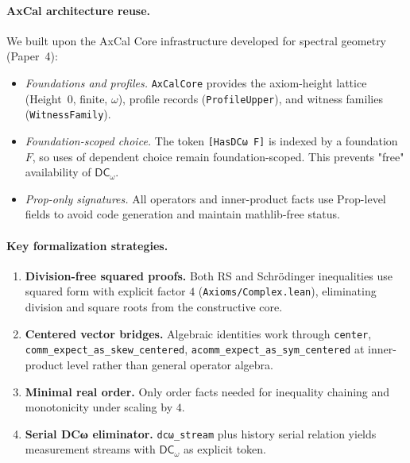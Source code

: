 \documentclass[11pt]{article}
\newcommand{\DCw}{\mathsf{DC}_{\omega}}
\newcommand{\lean}[1]{\texttt{#1}}
\theoremstyle{plain}
\theoremstyle{definition}
\theoremstyle{remark}
\begin{document}
\paragraph{AxCal architecture reuse.}
We built upon the AxCal Core infrastructure developed for spectral geometry (Paper~4):
\begin{itemize}
  \item \emph{Foundations and profiles.} \lean{AxCalCore} provides the axiom-height lattice (Height~0, finite, $\omega$), profile records (\lean{ProfileUpper}), and witness families (\lean{WitnessFamily}).
  \item \emph{Foundation-scoped choice.} The token \lean{[HasDCω F]} is indexed by a foundation $F$, so uses of dependent choice remain foundation-scoped. This prevents "free" availability of $\DCw$.
  \item \emph{Prop-only signatures.} All operators and inner-product facts use Prop-level fields to avoid code generation and maintain mathlib-free status.
\end{itemize}

\paragraph{Key formalization strategies.}
\begin{enumerate}
  \item \textbf{Division-free squared proofs.} Both RS and Schrödinger inequalities use squared form with explicit factor $4$ (\texttt{Axioms/Complex.lean}), eliminating division and square roots from the constructive core.
  \item \textbf{Centered vector bridges.} Algebraic identities work through \lean{center}, \lean{comm\_expect\_as\_skew\_centered}, \lean{acomm\_expect\_as\_sym\_centered} at inner-product level rather than general operator algebra.
  \item \textbf{Minimal real order.} Only order facts needed for inequality chaining and monotonicity under scaling by $4$.
  \item \textbf{Serial DCω eliminator.} \lean{dcω\_stream} plus history serial relation yields measurement streams with $\DCw$ as explicit token.
\end{enumerate}
\end{document}
